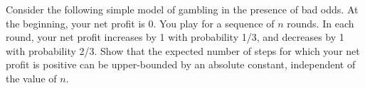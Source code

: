 \problem{}
Consider the following simple model of gambling in the presence of bad odds. At the beginning, your net profit is 0. You play for a sequence of $n$ rounds. In each round, your net profit increases by 1 with probability 1/3, and decreases by 1 with probability 2/3.
Show that the expected number of steps for which your net profit is positive can be upper-bounded by an absolute constant, independent of the value of $n$.

\solution{}
\newpage